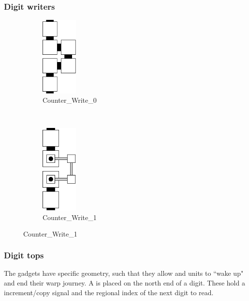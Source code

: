     \subsubsection{ Digit writers }
        \begin{figure}[H]
            \centering
            \begin{subfigure}[t]{0.2\textwidth}
                \centering
                \includegraphics[width=0.2\textwidth]{write/write_0}
                \caption{\label{fig:write/write_1} Counter\_Write\_0}
            \end{subfigure}%
            ~
            \begin{subfigure}[t]{0.2\textwidth}
                \centering
                \includegraphics[width=0.2\textwidth]{write/write_1}
                \caption{\label{fig:write/write_1} Counter\_Write\_1}
            \end{subfigure}%
        \end{figure}

    \subsubsection{Digit tops}
        The {\dtop} gadgets have specific geometry, such that they allow {\firstwarp} and
        {\secondwarp} units to ``wake up" and end their warp journey. A {\dtop} is placed on
        the north end of a digit. These hold a increment/copy signal and the regional index
        of the next digit to read.
        \vspace{1cm}

